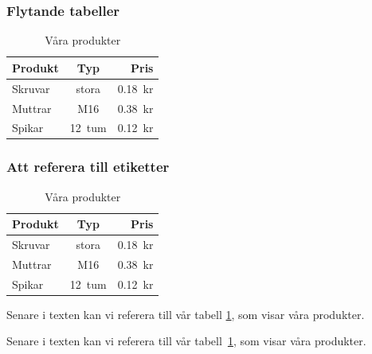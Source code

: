 \begin{frame}[fragile,t]
  \frametitle{Flytande tabeller}
  \vspace{2em}



  \begin{exlatex}
\begin{table}[t]
  \begin{tabular}{lcr}
    Produkt & Typ    & Pris    \\
    \hline
    Skruvar & stora  & 0.18~kr \\
    Muttrar & M16    & 0.38~kr \\
    Spikar  & 12~tum & 0.12~kr
  \end{tabular}
  \caption{Våra produkter}
\end{table}
  \end{exlatex}
\end{frame}

\begin{frame}[fragile,t]
  \frametitle{Att referera till etiketter}
  \vspace{1em}



  \begin{exlatex}
\begin{table}
  \begin{tabular}{lcr}
    Produkt & Typ    & Pris    \\
    \hline
    Skruvar & stora  & 0.18~kr \\
    Muttrar & M16    & 0.38~kr \\
    Spikar  & 12~tum & 0.12~kr
  \end{tabular}
  \caption{Våra produkter}
  \label{produkter}
\end{table}
Senare i texten kan vi referera till vår tabell \ref{produkter}, som visar våra produkter.

Senare i texten kan vi referera till vår tabell~\ref{produkter}, som visar våra produkter.
  \end{exlatex}

\end{frame}

